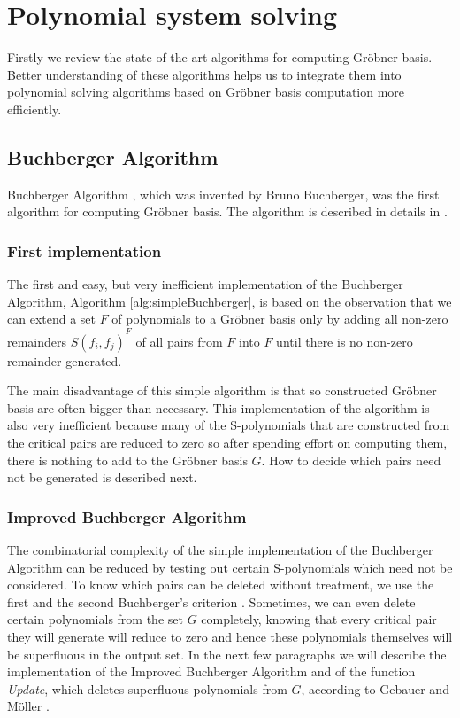\chapter{Polynomial system solving}
\label{chapter:polynomialSolving}
Firstly we review the state of the art algorithms for computing Gr\"obner basis. Better understanding of these algorithms helps us to integrate them into polynomial solving algorithms based on Gr\"obner basis computation more efficiently.

\section{Buchberger Algorithm}
Buchberger Algorithm \cite{Buchberger65}, which was invented by Bruno Buchberger, was the first algorithm for computing Gr\"obner basis. The algorithm is described in details in \cite{Becker93, Cox-Little-Shea97}.

\subsection{First implementation}
The first and easy, but very inefficient implementation of the Buchberger Algorithm, Algorithm \ref{alg:simpleBuchberger}, is based on the observation that we can extend a set $F$ of polynomials to a Gr\"obner basis only by adding all non-zero remainders $\overline{S(f_i, f_j)}^F$ of all pairs from $F$ into $F$ until there is no non-zero remainder generated.

The main disadvantage of this simple algorithm is that so constructed Gr\"obner basis are often bigger than necessary. This implementation of the algorithm is also very inefficient because many of the S-polynomials that are constructed from the critical pairs are reduced to zero so after spending effort on computing them, there is nothing to add to the Gr\"obner basis $G$. How to decide which pairs need not be generated is described next.



\subsection{Improved Buchberger Algorithm}
\label{subsec:ImprovedBuchberger}
The combinatorial complexity of the simple implementation of the Buchberger Algorithm can be reduced by testing out certain S-polynomials which need not be considered. To know which pairs can be deleted without treatment, we use the first and the second Buchberger's criterion \cite{Becker93}. Sometimes, we can even delete certain polynomials from the set $G$ completely, knowing that every critical pair they will generate will reduce to zero and hence these polynomials themselves will be superfluous in the output set. In the next few paragraphs we will describe the implementation of the Improved Buchberger Algorithm and of the function \textit{Update}, which deletes superfluous polynomials from $G$, according to Gebauer and M\"oller \cite{Gebauer-Moller88}.

